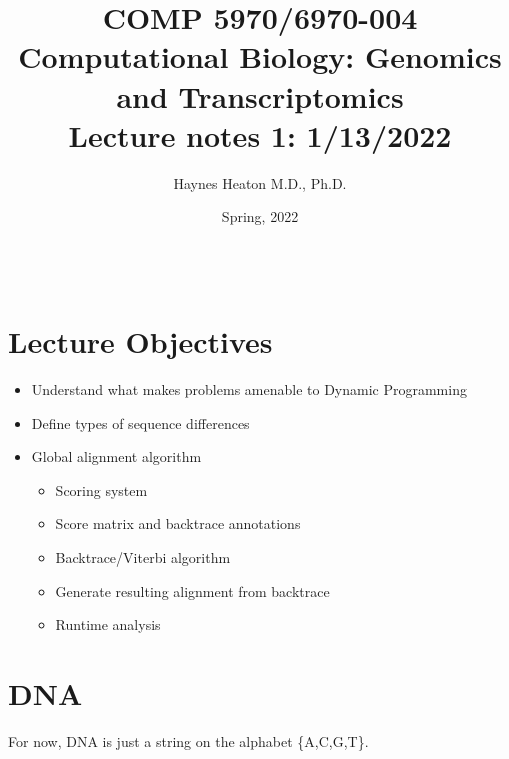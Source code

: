 \documentclass[11pt]{article}
\title{COMP 5970/6970-004 \\ Computational Biology: Genomics and Transcriptomics \\ Lecture notes 1: 1/13/2022 }
\author{Haynes Heaton M.D., Ph.D.}
\date{Spring, 2022}
\newcommand{\blankline}{\quad\pagebreak[2]}
\begin{document}
\maketitle

\blankline

\begin{tabular*}{.93\textwidth}{@{\extracolsep{\fill}}lr}



\hline
\end{tabular*}

\vspace{5 mm}


\section*{Lecture Objectives}
\begin{itemize}
\item Understand what makes problems amenable to Dynamic Programming
\item Define types of sequence differences
\item Global alignment algorithm
\begin{itemize}
\item Scoring system
\item Score matrix and backtrace annotations
\item Backtrace/Viterbi algorithm
\item Generate resulting alignment from backtrace
\item Runtime analysis
\end{itemize}
\end{itemize}


\section*{DNA}
For now, DNA is just a string on the alphabet \{A,C,G,T\}. 
\end{document}
